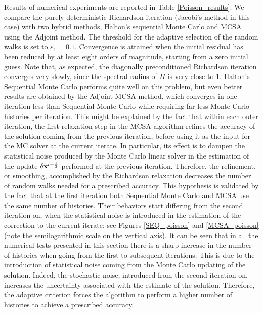 \documentclass[final,leqno,onefignum,onetabnum]{siamltex1213}
\begin{document}
Results of numerical experiments are reported in Table \ref{Poisson_results}.
We compare the purely deterministic Richardson iteration (Jacobi's method
in this case) with two hybrid
methods, Halton's
sequential Monte Carlo and MCSA using the Adjoint method.
The threshold
for the adaptive selection of the random walks is set
to $\varepsilon_1=0.1$.
Convergence is attained when the initial residual has been reduced
by at least eight orders of magnitude, starting from a zero initial guess.
Note that, as expected, the diagonally preconditioned Richardson iteration
converges very slowly, since the spectral radius of $H$ is very close to 1.
Halton's Sequential Monte Carlo performs quite well on this problem, but
even better results are obtained by the Adjoint MCSA method, which converges
in one iteration less than Sequential Monte Carlo while requiring far less
Monte Carlo histories per iteration. 
 This
might be explained by the fact that within each outer
iteration, the first relaxation step
in the MCSA algorithm refines the accuracy of the solution coming from the previous
iteration,
before using it as the input for the MC solver at the current iterate.
In particular, 
its effect is to dampen the statistical noise
produced by the Monte Carlo linear solver in the estimation of the update $\delta
{\bf x}^{l + \frac{1}{2}}$ performed at the previous iteration. Therefore, the refinement, 
or smoothing, accomplished by the Richardson relaxation decreases the number of
random walks needed
for a prescribed accuracy. This hypothesis is validated by the fact
that at the first iteration both Sequential Monte Carlo and MCSA use
the same number of histories. Their behaviors start differing from the
second iteration on, when the statistical noise is introduced in the estimation
of the correction to the current iterate; 
see Figures \ref{SEQ_poisson} and
\ref{MCSA_poisson} (note the semilogarithmic scale on the vertical axis). 
It can be seen that
in all the numerical tests presented in this section there is a sharp increase 
in the number of histories when going from the first to subsequent iterations. 
This is due to the introduction of statistical noise coming from the Monte Carlo 
updating of the solution. Indeed, the stochastic noise, introduced from the 
second iteration on, increases the uncertainty associated with the estimate 
of the solution. Therefore, the adaptive criterion forces the algorithm 
to perform a higher number of histories 
to achieve a prescribed accuracy. 
\end{document}
